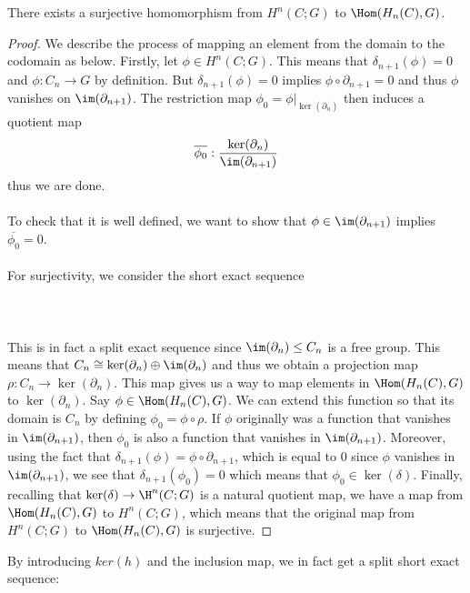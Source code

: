 \documentclass[a4paper]{article}
\begin{document}
\begin{prp}{}{} There exists a surjective homomorphism from $H^n(C;G)$ to $\Hom(H_n(C),G)$. \tcbline
\begin{proof}
We describe the process of mapping an element from the domain to the codomain as below. Firstly, let $\phi\in H^n(C;G)$. This means that $\delta_{n+1}(\phi)=0$ and $\phi:C_n\to G$ by definition. But $\delta_{n+1}(\phi)=0$ implies $\phi\circ\partial_{n+1}=0$ and thus $\phi$ vanishes on $\im(\partial_{n+1})$. The restriction map $\phi_0=\phi|_{\ker(\partial_n)}$ then induces a quotient map $$\overline{\phi_0}:\frac{\ker(\partial_n)}{\im(\partial_{n+1})}$$ thus we are done. \\~\\
To check that it is well defined, we want to show that $\phi\in\im(\partial_{n+1})$ implies $\overline{\phi_0}=0$. \\~\\
For surjectivity, we consider the short exact sequence\\~\\
\\~\\
This is in fact a split exact sequence since $\im(\partial_n)\leq C_n$ is a free group. This means that $C_n\cong\ker(\partial_n)\oplus\im(\partial_n)$ and thus we obtain a projection map $\rho:C_n\to\ker(\partial_n)$. This map gives us a way to map elements in $\Hom(H_n(C),G)$ to $\ker(\partial_n)$. Say $\phi\in\Hom(H_n(C),G)$. We can extend this function so that its domain is $C_n$ by defining $\phi_0=\phi\circ\rho$. If $\phi$ originally was a function that vanishes in $\im(\partial_{n+1})$, then $\phi_0$ is also a function that vanishes in $\im(\partial_{n+1})$. Moreover, using the fact that $\delta_{n+1}(\phi)=\phi\circ\partial_{n+1}$, which is equal to $0$ since $\phi$ vanishes in $\im(\partial_{n+1})$, we see that $\delta_{n+1}(\phi_0)=0$ which means that $\phi_0\in\ker(\delta)$. Finally, recalling that $\ker(\delta)\to\H^n(C;G)$ is a natural quotient map, we have a map from $\Hom(H_n(C),G)$ to $H^n(C;G)$, which means that the original map from $H^n(C;G)$ to $\Hom(H_n(C),G)$ is surjective. 
\end{proof}
\end{prp}

By introducing $ker(h)$ and the inclusion map, we in fact get a split short exact sequence: \\~\\
\\~\\
\end{document}
